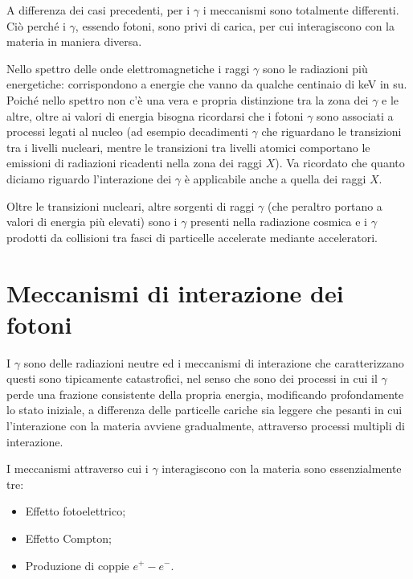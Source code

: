 A differenza dei casi precedenti, per i $\gamma$ i meccanismi sono totalmente differenti. Ciò perché i $\gamma$, essendo fotoni, sono privi di carica, per cui interagiscono con la materia in maniera diversa.

Nello spettro delle onde elettromagnetiche i raggi $\gamma$ sono le radiazioni più energetiche: corrispondono a energie che vanno da qualche centinaio di keV in su. Poiché nello spettro non c'è una vera e propria distinzione tra la zona dei $\gamma$ e le altre, oltre ai valori di energia bisogna ricordarsi che i fotoni $\gamma$ sono associati a processi legati al nucleo (ad esempio decadimenti $\gamma$ che riguardano le transizioni tra i livelli nucleari, mentre le transizioni tra livelli atomici comportano le emissioni di radiazioni ricadenti nella zona dei raggi $X$). Va ricordato che quanto diciamo riguardo l'interazione dei $\gamma$ è applicabile anche a quella dei raggi $X$.

Oltre le transizioni nucleari, altre sorgenti di raggi $\gamma$ (che peraltro portano a valori di energia più elevati) sono i $\gamma$ presenti nella radiazione cosmica e i $\gamma$ prodotti da collisioni tra fasci di particelle accelerate mediante acceleratori.

\section{Meccanismi di interazione dei fotoni}

I $\gamma$ sono delle radiazioni neutre ed i meccanismi di interazione che caratterizzano questi sono tipicamente catastrofici, nel senso che sono dei processi in cui il $\gamma$ perde una frazione consistente della propria energia, modificando profondamente lo stato iniziale, a differenza delle particelle cariche sia leggere che pesanti in cui l'interazione con la materia avviene gradualmente, attraverso processi multipli di interazione.

I meccanismi attraverso cui i $\gamma$ interagiscono con la materia sono essenzialmente tre:

\begin{itemize}
    \item Effetto fotoelettrico;
    \item Effetto Compton;
    \item Produzione di coppie $e^+ - e^-$.
\end{itemize}

